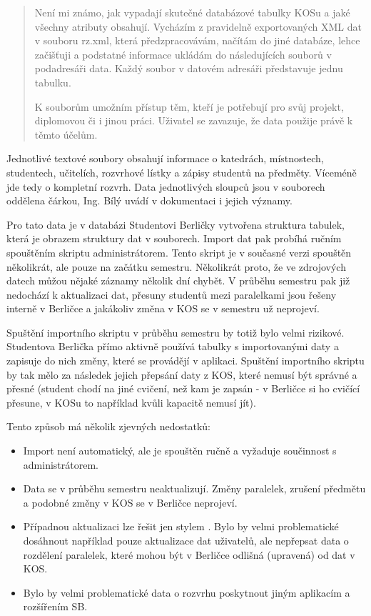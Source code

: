 \documentclass[11pt,twoside,a4paper]{book}
\begin{document}
\begin{quotation}
Není mi známo, jak vypadají skutečné databázové tabulky KOSu a jaké všechny atributy obsahují. Vycházím z pravidelně exportovaných XML dat v souboru rz.xml, která předzpracovávám, načítám do jiné databáze, lehce začišťuji a podstatné informace ukládám do následujících souborů v podadresáři data. Každý soubor v datovém adresáři představuje jednu tabulku.

K souborům umožním přístup těm, kteří je potřebují pro svůj projekt, diplomovou či i jinou práci. Uživatel se zavazuje, že data použije právě k těmto účelům.
\end{quotation}

Jednotlivé textové soubory obsahují informace o katedrách, místnostech, studentech, učitelích, rozvrhové lístky a zápisy studentů na předměty. Víceméně jde tedy o kompletní rozvrh. Data jednotlivých sloupců jsou v souborech oddělena čárkou, Ing. Bílý uvádí v dokumentaci i jejich významy.

Pro tato data je v databázi Studentovi Berličky vytvořena struktura tabulek, která je obrazem struktury dat v souborech. Import dat pak probíhá ručním spouštěním skriptu administrátorem. Tento skript je v současné verzi spouštěn několikrát, ale pouze na začátku semestru. Několikrát proto, že ve zdrojových datech můžou nějaké záznamy několik dní chybět. V průběhu semestru pak již nedochází k aktualizaci dat, přesuny studentů mezi paralelkami jsou řešeny interně v Berličce a jakákoliv změna v KOS se v semestru už neprojeví.

Spuštění importního skriptu v průběhu semestru by totiž bylo velmi rizikové. Studentova Berlička přímo aktivně používá tabulky s importovanými daty a zapisuje do nich změny, které se provádějí v aplikaci. Spuštění importního skriptu by tak mělo za následek jejich přepsání daty z KOS, které nemusí být správné a přesné (student chodí na jiné cvičení, než kam je zapsán - v Berličce si ho cvičící přesune, v KOSu to například kvůli kapacitě nemusí jít).

Tento způsob má několik zjevných nedostatků:
\begin{itemize}
\item Import není automatický, ale je spouštěn ručně a vyžaduje součinnost s administrátorem.
\item Data se v průběhu semestru neaktualizují. Změny paralelek, zrušení předmětu a podobné změny v KOS se v Berličce neprojeví.
\item Případnou aktualizaci lze řešit jen stylem . Bylo by velmi problematické dosáhnout například pouze aktualizace dat uživatelů, ale nepřepsat data o rozdělení paralelek, které mohou být v Berličce odlišná (upravená) od dat v KOS.
\item Bylo by velmi problematické data o rozvrhu poskytnout jiným aplikacím a rozšířením SB.
\end{itemize}
\end{document}

